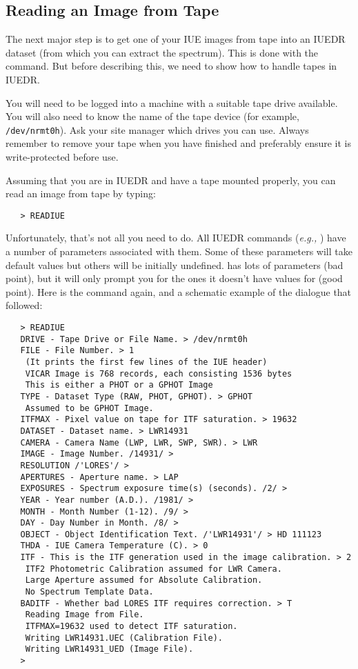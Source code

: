 \subsection{Reading an Image from Tape}

The next major step is to get one of your IUE images from tape into an IUEDR
dataset (from which you can extract the spectrum)\@.  This is done with the
 command.  But before describing this,
we need to show how to handle tapes in IUEDR\@.

You will need to be logged into a machine with a suitable tape drive available.
You will also need to know the name of the tape device (for example,
\verb+/dev/nrmt0h+)\@.  Ask your site manager which drives you can use.
Always remember to remove your tape when you have finished and preferably ensure
it is write-protected before use.

Assuming that you are in IUEDR and have a tape mounted properly, you can read
an image from tape by typing:

\begin{verbatim}
   > READIUE
\end{verbatim}

Unfortunately, that's not all you need to do.  All IUEDR commands ({\it{e.g.,}}
) have a number of parameters associated
with them.  Some of
these parameters will take default values but others will be initially
undefined.
 has lots of parameters (bad point),
but it will only prompt you for the
ones it doesn't have values for (good point)\@.  Here is the command again,
and a schematic example of the dialogue that followed:

\begin{verbatim}
   > READIUE
   DRIVE - Tape Drive or File Name. > /dev/nrmt0h
   FILE - File Number. > 1
    (It prints the first few lines of the IUE header)
    VICAR Image is 768 records, each consisting 1536 bytes
    This is either a PHOT or a GPHOT Image
   TYPE - Dataset Type (RAW, PHOT, GPHOT). > GPHOT
    Assumed to be GPHOT Image.
   ITFMAX - Pixel value on tape for ITF saturation. > 19632
   DATASET - Dataset name. > LWR14931
   CAMERA - Camera Name (LWP, LWR, SWP, SWR). > LWR
   IMAGE - Image Number. /14931/ >
   RESOLUTION /'LORES'/ >
   APERTURES - Aperture name. > LAP
   EXPOSURES - Spectrum exposure time(s) (seconds). /2/ >
   YEAR - Year number (A.D.). /1981/ >
   MONTH - Month Number (1-12). /9/ >
   DAY - Day Number in Month. /8/ >
   OBJECT - Object Identification Text. /'LWR14931'/ > HD 111123
   THDA - IUE Camera Temperature (C). > 0
   ITF - This is the ITF generation used in the image calibration. > 2
    ITF2 Photometric Calibration assumed for LWR Camera.
    Large Aperture assumed for Absolute Calibration.
    No Spectrum Template Data.
   BADITF - Whether bad LORES ITF requires correction. > T
    Reading Image from File.
    ITFMAX=19632 used to detect ITF saturation.
    Writing LWR14931.UEC (Calibration File).
    Writing LWR14931_UED (Image File).
   >
\end{verbatim}

